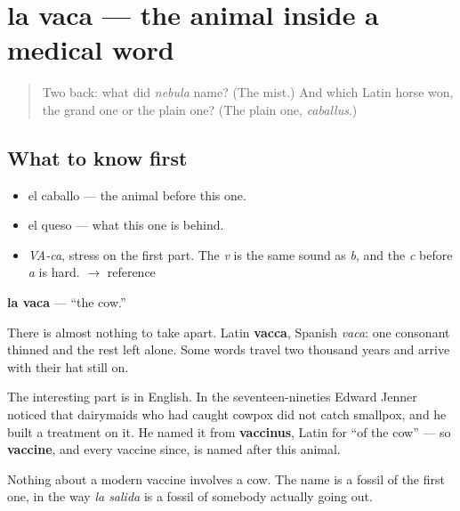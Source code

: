 \section[la vaca]{la vaca — the animal inside a medical word}

\label{lesson:ES-C296-vaca}



\begin{quote}
Two back: what did \emph{nebula} name? (The mist.) And which Latin horse won, the grand one or the plain one? (The plain one, \emph{caballus}.)
\end{quote}

\subsection*{What to know first}
\begin{itemize}
\raggedright
  \item el caballo — the animal before this one.
  \item el queso — what this one is behind.
\end{itemize}

\begin{sounds}
\begin{itemize}
\raggedright
  \item \emph{VA-ca}, stress on the first part. The \emph{v} is the same sound as \emph{b}, and the \emph{c} before \emph{a} is hard. $\to$ reference
\end{itemize}
\end{sounds}

\begin{cousinweb}
\textbf{la vaca} — \textquotedblleft{}the cow.\textquotedblright{}

There is almost nothing to take apart. Latin \textbf{vacca}, Spanish \emph{vaca}: one consonant thinned and the rest left alone. Some words travel two thousand years and arrive with their hat still on.

The interesting part is in English. In the seventeen-nineties Edward Jenner noticed that dairymaids who had caught cowpox did not catch smallpox, and he built a treatment on it. He named it from \textbf{vaccinus}, Latin for \textquotedblleft{}of the cow\textquotedblright{} — so \textbf{vaccine}, and every vaccine since, is named after this animal.

Nothing about a modern vaccine involves a cow. The name is a fossil of the first one, in the way \emph{la salida} is a fossil of somebody actually going out.
\end{cousinweb}

